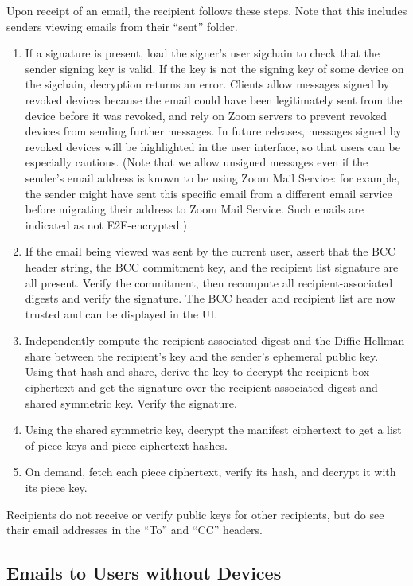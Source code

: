Upon receipt of an email, the recipient follows these steps. Note that this includes senders viewing
emails from their ``sent'' folder.

\begin{enumerate}
\item If a signature is present, load the signer's user sigchain to check that the sender signing
key is valid. If the key is not the signing key of some device on the sigchain, decryption returns
an error. Clients allow messages signed by revoked devices because the email could have been
legitimately sent from the device before it was revoked, and rely on Zoom servers to prevent revoked
devices from sending further messages. In future releases, messages signed by revoked devices will
be highlighted in the user interface, so that users can be especially cautious. (Note that we allow
unsigned messages even if the sender's email address is known to be using Zoom Mail Service: for
example, the sender might have sent this specific email from a different email service before
migrating their address to Zoom Mail Service. Such emails are indicated as not E2E-encrypted.)
\item If the email being viewed was sent by the current user, assert that the BCC header string, the
BCC commitment key, and the recipient list signature are all present. Verify the commitment, then
recompute all recipient-associated digests and verify the signature. The BCC header and
recipient list are now trusted and can be displayed in the UI.
\item Independently compute the recipient-associated digest and the Diffie-Hellman share between
the recipient's key and the sender's ephemeral public key. Using that hash and share, derive the key
to decrypt the recipient box ciphertext and get the signature over the
recipient-associated digest and shared symmetric key. Verify the signature.
\item Using the shared symmetric key, decrypt the manifest ciphertext to get a
list of piece keys
and piece ciphertext hashes.
\item On demand, fetch each piece ciphertext, verify its hash, and decrypt it with its piece key.
\end{enumerate}

Recipients do not receive or verify public keys for other recipients, but do see their email
addresses in the ``To'' and ``CC'' headers.

\subsection{Emails to Users without Devices}

